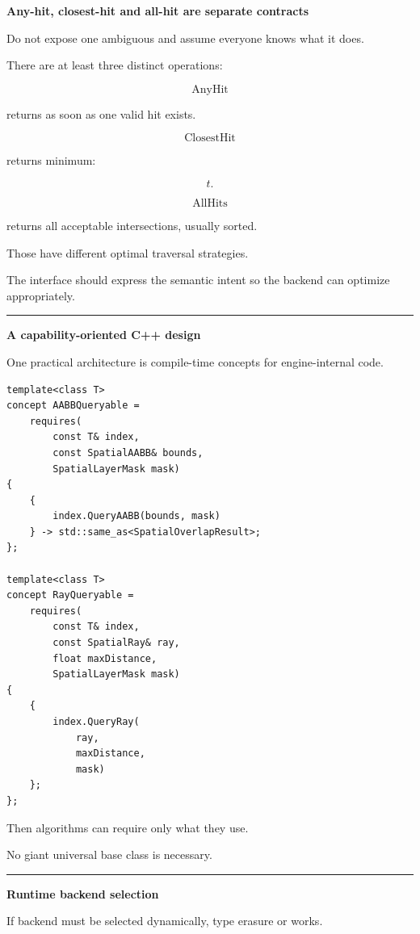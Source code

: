 \textbf{Any-hit, closest-hit and all-hit are separate contracts}

Do not expose one ambiguous  and assume everyone knows what it does.

There are at least three distinct operations:

\[
\text{AnyHit}
\]

returns as soon as one valid hit exists.

\[
\text{ClosestHit}
\]

returns minimum:

\[
t.
\]

\[
\text{AllHits}
\]

returns all acceptable intersections, usually sorted.

Those have different optimal traversal strategies.

The interface should express the semantic intent so the backend can optimize appropriately.

\begin{center}\rule{0.5\linewidth}{0.5pt}\end{center}

\textbf{A capability-oriented C++ design}

One practical architecture is compile-time concepts for engine-internal code.

\begin{verbatim}
template<class T>
concept AABBQueryable =
    requires(
        const T& index,
        const SpatialAABB& bounds,
        SpatialLayerMask mask)
{
    {
        index.QueryAABB(bounds, mask)
    } -> std::same_as<SpatialOverlapResult>;
};

template<class T>
concept RayQueryable =
    requires(
        const T& index,
        const SpatialRay& ray,
        float maxDistance,
        SpatialLayerMask mask)
{
    {
        index.QueryRay(
            ray,
            maxDistance,
            mask)
    };
};
\end{verbatim}

Then algorithms can require only what they use.

No giant universal base class is necessary.

\begin{center}\rule{0.5\linewidth}{0.5pt}\end{center}

\textbf{Runtime backend selection}

If backend must be selected dynamically, type erasure or  works.

